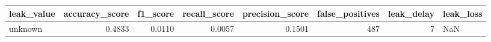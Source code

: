\begin{tabular}{lrrrrrrl}
\toprule
leak\_value & accuracy\_score & f1\_score & recall\_score & precision\_score & false\_positives & leak\_delay & leak\_loss \\
\midrule
unknown & 0.4833 & 0.0110 & 0.0057 & 0.1501 & 487 & 7 & NaN \\
\bottomrule
\end{tabular}
